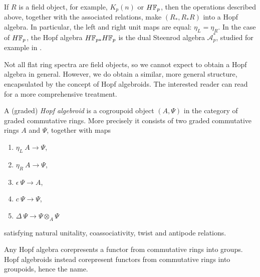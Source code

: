 \begin{remark}
    \label{ch0:rm:fields-give-hopf-algebras}
    If $R$ is a field object, for example, $K_p(n)$ or $H\mathbb{F}_p$, then the operations described above, together with the associated relations, make $(R_*, R_*R)$ into a Hopf algebra. In particular, the left and right unit maps are equal: $\eta_L=\eta_R$. In the case of $H\mathbb{F}_p$, the Hopf algebra $H\mathbb{F}_{p*}H\mathbb{F}_p$ is the dual Steenrod algebra $\mathcal{A}^*_p$, studied for example in \cite{milnor_1958}. 
\end{remark}

Not all flat ring spectra are field objects, so we cannot expect to obtain a Hopf algebra in general. However, we do obtain a similar, more general structure, encapsulated by the concept of Hopf algebroids. The interested reader can read \cite[Appendix A.1]{ravenel_86} for a more comprehensive treatment. 

\begin{definition}
    \label{ch0:def:hopf-algebroid}
    A (graded) \emph{Hopf algebroid} is a cogroupoid object $(A, \Psi)$ in the category of graded commutative rings. More precisely it consists of two graded commutative rings $A$ and $\Psi$, together with maps 
    \begin{enumerate}
        \item $\eta_L\: A\longrightarrow \Psi$, 
        \item $\eta_R\: A\longrightarrow \Psi$,
        \item $\epsilon\: \Psi\longrightarrow A$,
        \item $c\: \Psi\longrightarrow \Psi$,
        \item $\Delta\: \Psi\longrightarrow \Psi\otimes_A\Psi$
    \end{enumerate}
    satisfying natural unitality, coassociativity, twist and antipode relations. 
\end{definition}

\begin{remark}
    Any Hopf algebra corepresents a functor from commutative rings into groups. Hopf algebroids instead corepresent functors from commutative rings into groupoids, hence the name. 
\end{remark}


